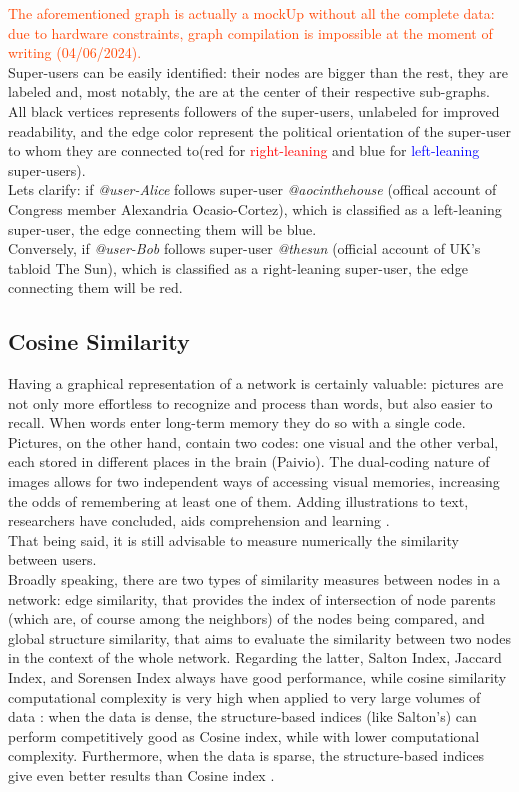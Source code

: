 \textcolor{OrangeRed}{The aforementioned graph is actually a mockUp without all the complete data: due to hardware constraints, graph compilation is impossible at the moment of writing (04/06/2024).}\\
Super-users can be easily identified: their nodes are bigger than the rest, they are labeled and, most notably, the are at the center of their respective sub-graphs. \\
All black vertices represents followers of the super-users, unlabeled for improved readability, and the edge color represent the political orientation of the super-user to whom they are connected to(red for \textcolor{red}{right-leaning} and blue for \textcolor{blue}{left-leaning} super-users). \\
Lets clarify: if \textit{@user-Alice} follows super-user \textit{@aocinthehouse} (offical account of Congress member Alexandria Ocasio-Cortez), which is classified as a left-leaning super-user, the edge connecting them will be blue. \\
Conversely, if \textit{@user-Bob} follows super-user \textit{@thesun} (official account of UK's tabloid The Sun), which is classified as a right-leaning super-user, the edge connecting them will be red.

\subsection{Cosine Similarity}
Having a graphical representation of a network is certainly valuable: pictures are not only more effortless to recognize and process than words, but also easier to recall. When words enter long-term memory they do so with a single code. Pictures, on the other hand, contain two codes: one visual and the other verbal, each stored in different places in the brain (Paivio). The dual-coding nature of images allows for two independent ways of accessing visual memories, increasing the odds of remembering at least one of them. Adding illustrations to text, researchers have concluded, aids comprehension and learning \cite{10.21083/partnership.v10i1.3137}.\\
That being said, it is still advisable to measure numerically the similarity between users.\\
Broadly speaking, there are two types of similarity measures between nodes in a network: edge similarity, that provides the index of intersection of node parents (which are, of course among the neighbors) of the nodes being compared, and global structure similarity, that aims to evaluate the similarity between two nodes in the context of the whole network. Regarding the latter, Salton Index, Jaccard Index, and Sorensen Index always have good performance, while cosine similarity computational complexity is very high when applied to very large volumes of data \cite{smilarityMeasuresSurvey}: when the data is dense, the structure-based indices (like Salton's) can perform competitively good as Cosine index, while with lower computational complexity. Furthermore, when the data is sparse, the structure-based indices give even better results than Cosine index \cite{10.1016/j.phpro.2010.07.033}.\\

